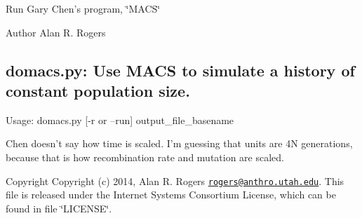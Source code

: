 Run Gary Chen's program, \char`\"{}\-M\-A\-C\-S\char`\"{}

\label{domacs_8py_domacs}%
\hypertarget{domacs_8py_domacs}{}%
 \begin{DoxyAuthor}{Author}
Alan R. Rogers \subsection*{domacs.\-py\-: Use M\-A\-C\-S to simulate a history of constant population size. }
\end{DoxyAuthor}


Usage\-: domacs.\-py \mbox{[}-\/r or --run\mbox{]} output\-\_\-file\-\_\-basename

Chen doesn't say how time is scaled. I'm guessing that units are 4\-N generations, because that is how recombination rate and mutation are scaled.

\begin{DoxyCopyright}{Copyright}
Copyright (c) 2014, Alan R. Rogers \href{mailto:rogers@anthro.utah.edu}{\tt rogers@anthro.\-utah.\-edu}. This file is released under the Internet Systems Consortium License, which can be found in file \char`\"{}\-L\-I\-C\-E\-N\-S\-E\char`\"{}. 
\end{DoxyCopyright}
